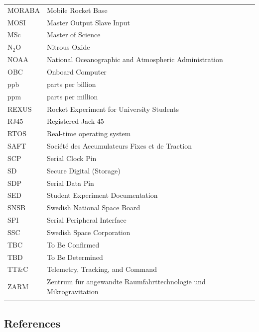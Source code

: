 \documentclass[a4paper,12pt,twoside]{article}
\begin{document}
\begin{longtable}{p{3cm} p{9cm}}
            MORABA      & Mobile Rocket Base \\
            MOSI        & Master Output Slave Input\\
            MSc         & Master of Science \\
            N$_{2}$O    & Nitrous Oxide \\
            NOAA        & National Oceanographic and Atmospheric Administration \\
            OBC         & Onboard Computer\\
            ppb         & parts per billion\\
            ppm         & parts per million\\
            REXUS       & Rocket Experiment for University Students \\
            RJ45        & Registered Jack 45 \\
            RTOS        & Real-time operating system\\
            SAFT        & Soci\'{e}t\'{e} des Accumulateurs Fixes et de Traction\\
            SCP         & Serial Clock Pin\\
            SD          & Secure Digital (Storage) \\
            SDP         & Serial Data Pin\\
            SED         & Student Experiment Documentation \\
            SNSB        & Swedish National Space Board \\
            SPI         & Serial Peripheral Interface\\
            SSC         & Swedish Space Corporation \\
            TBC         & To Be Confirmed\\
            TBD         & To Be Determined \\
            TT$\&$C     & Telemetry, Tracking, and Command\\
            ZARM        & Zentrum f{\"u}r angewandte Raumfahrttechnologie und Mikrogravitation \\            
        \label{tab:abbrevi}
    \end{longtable}
    \raggedbottom
\pagebreak
\subsection{References}
\end{document}
